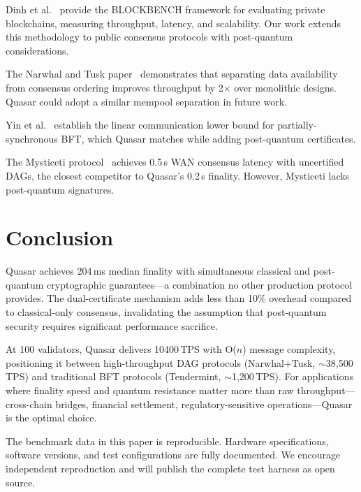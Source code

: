 \documentclass[11pt]{article}
\begin{document}
Dinh et al.~\cite{blockbench} provide the BLOCKBENCH framework for evaluating private
blockchains, measuring throughput, latency, and scalability. Our work extends this
methodology to public consensus protocols with post-quantum considerations.

The Narwhal and Tusk paper~\cite{narwhal-tusk} demonstrates that separating data
availability from consensus ordering improves throughput by 2$\times$ over monolithic
designs. Quasar could adopt a similar mempool separation in future work.

Yin et al.~\cite{hotstuff} establish the linear communication lower bound for
partially-synchronous BFT, which Quasar matches while adding post-quantum certificates.

The Mysticeti protocol~\cite{mysticeti} achieves 0.5\,s WAN consensus latency with
uncertified DAGs, the closest competitor to Quasar's 0.2\,s finality. However,
Mysticeti lacks post-quantum signatures.

\section{Conclusion}
\label{sec:conclusion}

Quasar achieves 204\,ms median finality with simultaneous classical and post-quantum
cryptographic guarantees---a combination no other production protocol provides. The
dual-certificate mechanism adds less than 10\% overhead compared to classical-only
consensus, invalidating the assumption that post-quantum security requires significant
performance sacrifice.

At 100 validators, Quasar delivers \num{10400}\,TPS with O($n$) message complexity,
positioning it between high-throughput DAG protocols (Narwhal+Tusk, $\sim$38{,}500\,TPS)
and traditional BFT protocols (Tendermint, $\sim$1{,}200\,TPS). For applications where
finality speed and quantum resistance matter more than raw throughput---cross-chain
bridges, financial settlement, regulatory-sensitive operations---Quasar is the
optimal choice.

The benchmark data in this paper is reproducible. Hardware specifications, software
versions, and test configurations are fully documented. We encourage independent
reproduction and will publish the complete test harness as open source.

\end{document}
